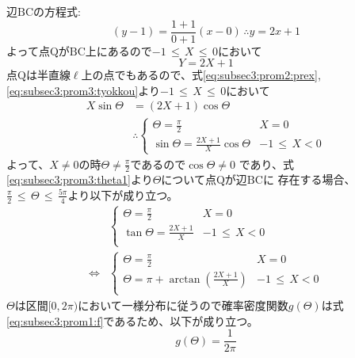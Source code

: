 \begin{enumerate}[(1)]
    辺$\mathrm{BC}$の方程式:
    \begin{equation*}
        (y - 1) = \frac{1 + 1}{0 + 1}(x - 0)\, \therefore y = 2x + 1
    \end{equation*}
    よって点$\mathrm{Q}$が$\mathrm{BC}$上にあるので$-1\, \leq\, X\, \leq\, 0$において
    \begin{equation}
        Y = 2X + 1\label{eq:subsec3:prom3:tyokkou}
    \end{equation}
    点$\mathrm{Q}$は半直線$\ell$上の点でもあるので、式\eqref{eq:subsec3:prom2:prex}, \eqref{eq:subsec3:prom3:tyokkou}より$-1\, \leq\, X\, \leq\, 0$において
    \begin{align}
        X\sin\Theta &= \left(2X + 1\right)\cos\Theta\nonumber\\
        &\therefore
        \begin{cases}
            \Theta = \frac{\pi}{2} & X = 0\\
            \sin\Theta = \frac{2X + 1}{X}\cos\Theta & -1\, \leq\, X < 0
        \end{cases}\label{eq:subsec3:prom3:theta1}
    \end{align}
    よって、$X \neq 0$の時$\Theta \neq \frac{\pi}{2}$であるので$\cos\Theta \neq 0$
    であり、式\eqref{eq:subsec3:prom3:theta1}より$\Theta$について点$\mathrm{Q}$が辺$\mathrm{BC}$に
    存在する場合、$\frac{\pi}{2} \, \leq\, \Theta\, \leq\, \frac{5\pi}{4}$より以下が成り立つ。
    \begin{align}
        &\begin{cases}
            \Theta = \frac{\pi}{2} & X = 0\\
            \tan\Theta = \frac{2X + 1}{X} & -1\, \leq\, X < 0\\
        \end{cases}\nonumber\\
        \Longleftrightarrow&
        \begin{cases}
            \Theta = \frac{\pi}{2} & X = 0\\
            \Theta = \pi + \arctan\left(\frac{2X + 1}{X}\right) & -1\, \leq\, X < 0\\
        \end{cases}\label{eq:subsec3:prom3:theta2}
    \end{align}
    $\Theta$は区間$[0, 2\pi)$において一様分布に従うので確率密度関数$g(\Theta)$は式
    \eqref{eq:subsec3:prom1:f}であるため、以下が成り立つ。
    \begin{equation*}
        g(\Theta) = \frac{1}{2\pi}
    \end{equation*}

\end{enumerate}
